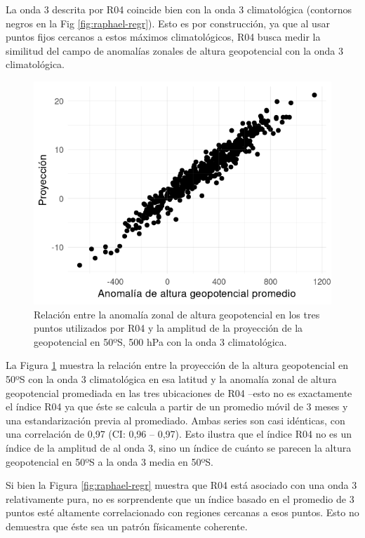 \documentclass[12pt,oneside,a4paper]{reedthesis}
\begin{document}
La onda 3 descrita por R04 coincide bien con la onda 3 climatológica (contornos negros en la Fig \ref{fig:raphael-regr}).
Esto es por construcción, ya que al usar puntos fijos cercanos a estos máximos climatológicos, R04 busca medir la similitud del campo de anomalías zonales de altura geopotencial con la onda 3 climatológica.

\begin{figure}

{\centering \includegraphics{figures/15-onda3/pseudo-raphael-1} 

}

\caption{Relación entre la anomalía zonal de altura geopotencial en los tres puntos utilizados por R04 y la amplitud de la proyección de la geopotencial en 50ºS, 500 hPa con la onda 3 climatológica.}\label{fig:pseudo-raphael}
\end{figure}



La Figura \ref{fig:pseudo-raphael} muestra la relación entre la proyección de la altura geopotencial en 50ºS con la onda 3 climatológica en esa latitud y la anomalía zonal de altura geopotencial promediada en las tres ubicaciones de R04 --esto no es exactamente el índice R04 ya que éste se calcula a partir de un promedio móvil de 3 meses y una estandarización previa al promediado.
Ambas series son casi idénticas, con una correlación de 0,97 (CI: 0,96 -- 0,97).
Esto ilustra que el índice R04 no es un índice de la amplitud de al onda 3, sino un índice de cuánto se parecen la altura geopotencial en 50ºS a la onda 3 media en 50ºS.

Si bien la Figura \ref{fig:raphael-regr} muestra que R04 está asociado con una onda 3 relativamente pura, no es sorprendente que un índice basado en el promedio de 3 puntos esté altamente correlacionado con regiones cercanas a esos puntos.
Esto no demuestra que éste sea un patrón físicamente coherente.
\end{document}
